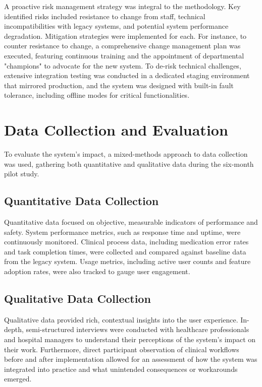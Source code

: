 A proactive risk management strategy was integral to the methodology. Key identified risks included resistance to change from staff, technical incompatibilities with legacy systems, and potential system performance degradation. Mitigation strategies were implemented for each. For instance, to counter resistance to change, a comprehensive change management plan was executed, featuring continuous training and the appointment of departmental "champions" to advocate for the new system. To de-risk technical challenges, extensive integration testing was conducted in a dedicated staging environment that mirrored production, and the system was designed with built-in fault tolerance, including offline modes for critical functionalities.

\section{Data Collection and Evaluation}

To evaluate the system's impact, a mixed-methods approach to data collection was used, gathering both quantitative and qualitative data during the six-month pilot study.

\subsection{Quantitative Data Collection}
Quantitative data focused on objective, measurable indicators of performance and safety. System performance metrics, such as response time and uptime, were continuously monitored. Clinical process data, including medication error rates and task completion times, were collected and compared against baseline data from the legacy system. Usage metrics, including active user counts and feature adoption rates, were also tracked to gauge user engagement.

\subsection{Qualitative Data Collection}
Qualitative data provided rich, contextual insights into the user experience. In-depth, semi-structured interviews were conducted with healthcare professionals and hospital managers to understand their perceptions of the system's impact on their work. Furthermore, direct participant observation of clinical workflows before and after implementation allowed for an assessment of how the system was integrated into practice and what unintended consequences or workarounds emerged.

